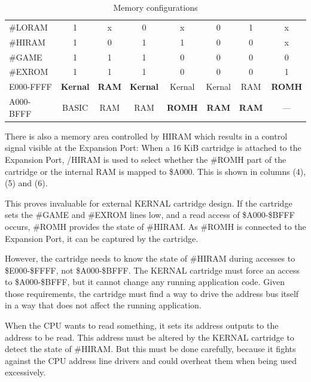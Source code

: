 \documentclass[a4paper,oneside]{memoir}
\begin{document}
\begin{table}
    \centering
    \begin{tabularx}{\textwidth}{lccccccc}

        \toprule
        \#LORAM & 1 & x & 0 & x & 0 & 1 & x \\[3pt]
        \#HIRAM & 1 & 0 & 1 & 1 & 0 & 0 & x \\[3pt]
        \#GAME  & 1 & 1 & 1 & 0 & 0 & 0 & 0 \\[3pt]
        \#EXROM & 1 & 1 & 1 & 0 & 0 & 0 & 1 \\[3pt]
        \midrule
        E000-FFFF & \textbf{Kernal} & \textbf{RAM} & \textbf{Kernal} &
          Kernal         & Kernal        & RAM           & \textbf{ROMH} \\[3pt]
        A000-BFFF & BASIC            & RAM           & RAM              &
          \textbf{ROMH} & \textbf{RAM} & \textbf{RAM} & --- \\[3pt]
        \bottomrule
    \end{tabularx}
    \caption{Memory configurations}
    \label{tab:mem-configs}
\end{table}

There is also a memory area controlled by HIRAM which results in a
control signal visible at the Expansion Port: When a 16 KiB
cartridge is attached to the Expansion Port, /HIRAM is used to
select whether the \#ROMH part of the cartridge or the internal RAM
is mapped to \$A000. This is shown in columns (4), (5) and (6).

This proves invaluable for external KERNAL cartridge design. If the
cartridge sets the \#GAME and \#EXROM lines low, and a read
access of \$A000-\$BFFF occurs, \#ROMH provides the state of
\#HIRAM. As \#ROMH is connected to the Expansion Port, it can be
captured by the cartridge.

However, the cartridge needs to know the state of \#HIRAM during 
accesses to \$E000-\$FFFF, not \$A000-\$BFFF. The KERNAL
cartridge must force an access to \$A000-\$BFFF, but it cannot
change any running application code. Given those requirements, the
cartridge must find a way to drive the address bus itself in a way
that does not affect the running application.

When the CPU wants to read something, it sets its address outputs to
the address to be read. This address must be altered by the KERNAL 
cartridge to detect the state of \#HIRAM. But this must be done 
carefully, because it fights against the CPU address
line drivers and could overheat them when being used excessively.
\end{document}

